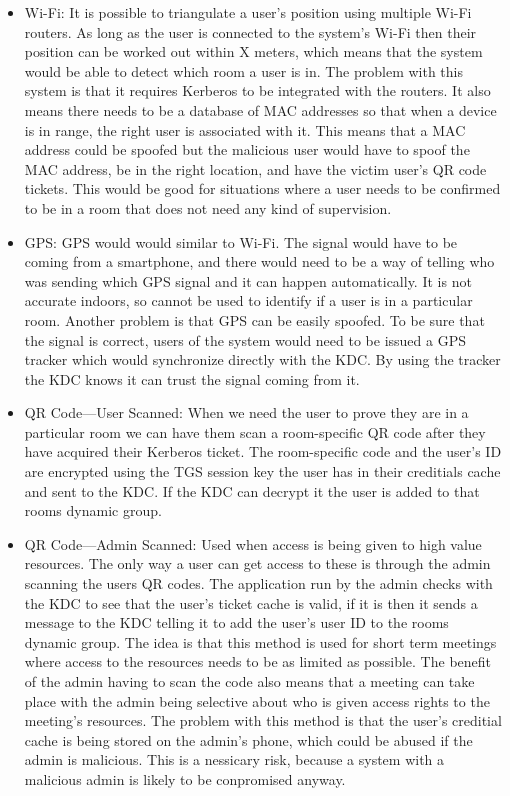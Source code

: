 \documentclass[]{report}   %
\begin{document}
\begin{itemize}

\item Wi-Fi: It is possible to triangulate a user’s position using multiple Wi-Fi routers. As long as the user is connected to the system's Wi-Fi then their position can be worked out within X meters, which means that the system would be able to detect which room a user is in. The problem with this system is that it requires Kerberos to be integrated with the routers. It also means there needs to be a database of MAC addresses so that when a device is in range, the right user is associated with it. This means that a MAC address could be spoofed but the malicious user would have to spoof the MAC address, be in the right location, and have the victim user's QR code tickets. This would be good for situations where a user needs to be confirmed to be in a room that does not need any kind of supervision.

\item GPS: GPS would would similar to Wi-Fi. The signal would have to be coming from a smartphone, and there would need to be a way of telling who was sending which GPS signal and it can happen automatically. It is not accurate indoors, so cannot be used to identify if a user is in a particular room. Another problem is that GPS can be easily spoofed. To be sure that the signal is correct, users of the system would need to be issued a GPS tracker which would synchronize directly with the KDC. By using the tracker the KDC knows it can trust the signal coming from it.

\item QR Code---User Scanned: When we need the user to prove they are in a particular room we can have them scan a room-specific QR code after they have acquired their Kerberos ticket. The room-specific code and the user's ID are encrypted using the TGS session key the user has in their creditials cache and sent to the KDC. If the KDC can decrypt it the user is added to that rooms dynamic group.

\item QR Code---Admin Scanned: Used when access is being given to high value resources. The only way a user can get access to these is through the admin scanning the users QR codes. The application run by the admin checks with the KDC to see that the user's ticket cache is valid, if it is then it sends a message to the KDC telling it to add the user's user ID to the rooms dynamic group. The idea is that this method is used for short term meetings where access to the resources needs to be as limited as possible. The benefit of the admin having to scan the code also means that a meeting can take place with the admin being selective about who is given access rights to the meeting's resources. The problem with this method is that the user's creditial cache is being stored on the admin's phone, which could be abused if the admin is malicious. This is a nessicary risk, because a system with a malicious admin is likely to be conpromised anyway.

\end{itemize}
\end{document}
